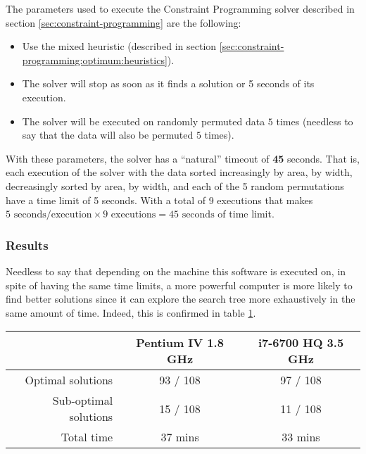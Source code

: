 The parameters used to execute the Constraint Programming solver described in section
\ref{sec:constraint-programming} are the following:
\begin{itemize}
	\item Use the mixed heuristic (described in section \ref{sec:constraint-programming:optimum:heuristics}).
	\item The solver will stop as soon as it finds a solution or 5 seconds of its execution.
	\item The solver will be executed on randomly permuted data $5$ times (needless to
	say that the data will also be permuted $5$ times).
\end{itemize}

With these parameters, the solver has a ``natural'' timeout of \textbf{45} seconds.
That is, each execution of the solver with the data sorted increasingly by area, by
width, decreasingly sorted by area, by width, and each of the 5 random permutations
have a time limit of 5 seconds. With a total of 9 executions that makes
$5 \text{ seconds/execution} \times 9 \text{ executions} = 45 \text{ seconds}$ of time limit.

\subsubsection{Results}
\label{sec:benchmarking:constraint-programming:results}

Needless to say that depending on the machine this software is executed on,
in spite of having the same time limits, a more powerful computer is more likely
to find better solutions since it can explore the search tree more exhaustively
in the same amount of time. Indeed, this is confirmed in table \ref{table:CP-results}.

\begin{table}[H]
\centering
	\begin{tabular}{rcc}
								& Pentium IV 1.8 GHz & i7-6700 HQ 3.5 GHz \\
		\midrule
		Optimal solutions		& 93 / 108			 & 97 / 108 \\
		Sub-optimal solutions	& 15 / 108			 & 11 / 108 \\
		Total time				& 37 mins			 & 33 mins \\
	\end{tabular}
	\label{table:CP-results}
\end{table}

